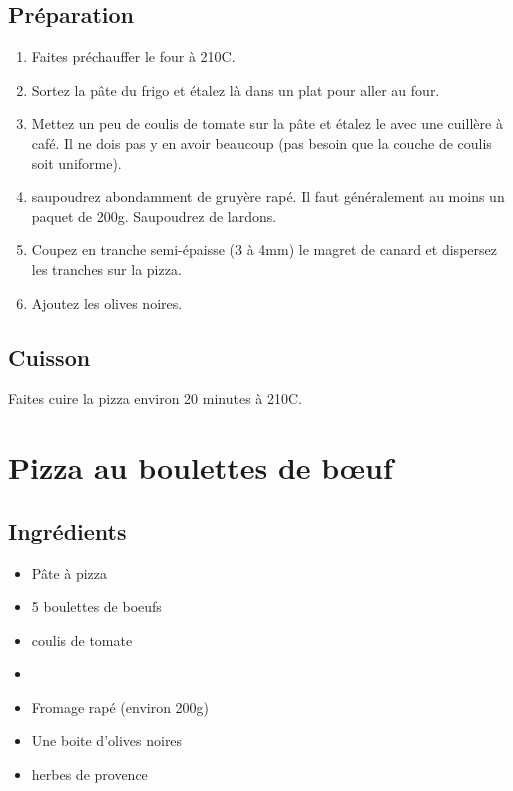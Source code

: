 \subsection*{Préparation}
\begin{enumerate}
\item Faites préchauffer le four à 210\degres C.
\item Sortez la pâte du frigo et étalez là dans un plat pour aller au four.
\item Mettez un peu de coulis de tomate sur la pâte et étalez le avec une cuillère à café. Il ne dois pas y en avoir beaucoup (pas besoin que la couche de coulis soit uniforme).
\item saupoudrez abondamment de gruyère rapé. Il faut généralement au moins un paquet de 200g. Saupoudrez de lardons.
\item Coupez en tranche semi-épaisse (3 à 4mm) le magret de canard et dispersez les tranches sur la pizza.
\item Ajoutez les olives noires.
\end{enumerate}

\subsection*{Cuisson}
Faites cuire la pizza environ 20 minutes à 210\degres C.

\newpage
\section{Pizza au boulettes de bœuf}
\subsection*{Ingrédients}
\begin{itemize}
\item Pâte à pizza
\item 5 boulettes de boeufs
\item coulis de tomate
\item
\item Fromage rapé (environ 200g)
\item Une boite d'olives noires
\item herbes de provence
\end{itemize}

